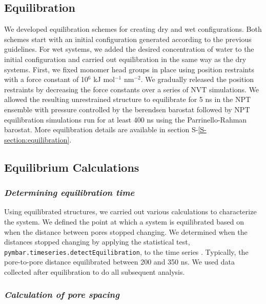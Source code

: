 \documentclass[journal=jpcbfk,manuscript=article]{achemso}
\begin{document}
  \subsection{Equilibration}
  
  We developed equilibration schemes for creating dry and wet configurations.
  Both schemes start with an initial configuration generated according to the
  previous guidelines. For wet systems, we added the desired concentration of
  water to the initial configuration and carried out equilibration in the same
  way as the dry systems. First, we fixed monomer head groups in place using
  position restraints with a force constant of 10$^6$ kJ mol$^{-1}$ nm$^{-2}$. We
  gradually released the position restraints by decreasing the force constants
  over a series of NVT simulations. We allowed the resulting unrestrained
  structure to equilibrate for 5 ns in the NPT ensemble with pressure controlled
  by the berendsen barostat followed by NPT equilibration simulations run for at
  least 400 ns using the Parrinello-Rahman barostat. More equilibration details
  are available in section S-\ref{S-section:equilibration}.

  \subsection{Equilibrium Calculations}

  \subsubsection{\textit{Determining equilibration time}}\label{method:equil_time}

  Using equilibrated structures, we carried out various calculations to
  characterize the system. We defined the point at which a system is equilibrated
  based on when the distance between pores stopped changing.  We determined when
  the distances stopped changing by applying the statistical test,
  \texttt{pymbar.timeseries.detectEquilibration}, to the time series
  \cite{chodera_simple_2016,shirts_statistically_2008}. Typically, the pore-to-pore
  distance equilibrated between 200 and 350 ns. We used data collected after 
  equilibration to do all subsequent analysis.

  \subsubsection{\textit{Calculation of pore spacing}}\label{method:pore_spacing}
\end{document}
